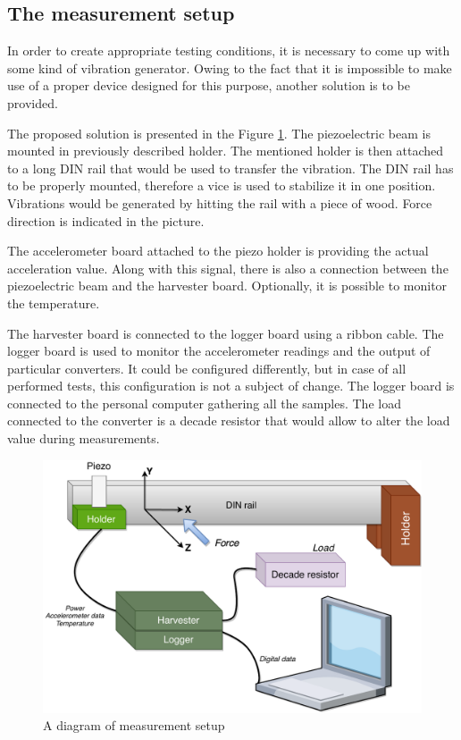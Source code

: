 \documentclass[12pt,a4paper]{article}
\begin{document}
\subsection{The measurement setup}
In order to create appropriate testing conditions, it is necessary to come up with some kind of vibration generator. Owing to the fact that it is impossible to make use of a proper device designed for this purpose, another solution is to be provided.
\par
The proposed solution is presented in the Figure \ref{fig:setup}. The piezoelectric beam is mounted in previously described holder. The mentioned holder is then attached to a long DIN rail that would be used to transfer the vibration. The DIN rail has to be properly mounted, therefore a vice is used to stabilize it in one position. Vibrations would be generated by hitting the rail with a piece of wood. Force direction is indicated in the picture.
\par

The accelerometer board attached to the piezo holder is providing the actual acceleration value. Along with this signal, there is also a connection between the piezoelectric beam and the harvester board. Optionally, it is possible to monitor the temperature.
\par

The harvester board is connected to the logger board using a ribbon cable. The logger board is used to monitor the accelerometer readings and the output of particular converters. It could be configured differently, but in case of all performed tests, this configuration is not a subject of change. The logger board is connected to the personal computer gathering all the samples. The load connected to the converter is a decade resistor that would allow to alter the load value during measurements.

\begin{figure}[ht!]
\includegraphics[scale=0.65]{setup.pdf}
\caption{A diagram of measurement setup}
\label{fig:setup}
\end{figure}
\par
\end{document}

